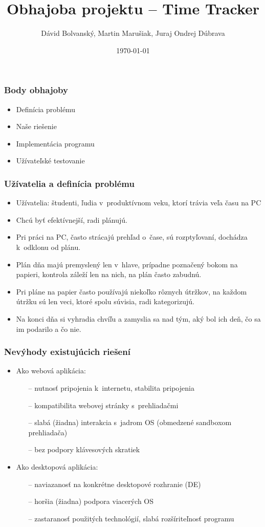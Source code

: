 \documentclass[10pt,xcolor=pdflatex]{beamer}
\title[Time Tracker]{Obhajoba projektu -- Time Tracker}
\author[]{\small Dávid Bolvanský, Martin Marušiak, Juraj Ondrej Dúbrava}
\institute[]{}
\date{\today}
\begin{document}
\frame[plain]{\titlepage}

\begin{frame}
\frametitle{Body obhajoby}
\begin{itemize}
	\item Definícia problému
	\item Naše riešenie
	\item Implementácia programu
	\item Užívateľské testovanie
\end{itemize}
\end{frame}


\begin{frame}
\frametitle{Užívatelia a definícia problému}
\begin{itemize}
	\item Užívatelia: študenti, ľudia v~produktívnom veku, ktorí trávia veľa času na PC
	\item Chcú byť efektívnejší, radi plánujú.
	\item Pri práci na PC, často strácajú prehľad o~čase, sú rozptyľovaní, dochádza k~odklonu od plánu.
	\item Plán dňa majú premyslený len v~hlave, prípadne poznačený bokom na papieri, kontrola záleží len na nich, na plán často zabudnú.
	\item Pri pláne na papier často používajú niekoľko rôznych útržkov, na každom útržku sú len veci, ktoré spolu súvisia, radi kategorizujú.
	\item Na konci dňa si vyhradia chvíľu a zamyslia sa nad tým, aký bol ich deň, čo sa im podarilo a čo nie.
\end{itemize}
\end{frame}

\begin{frame}
	\frametitle{Nevýhody existujúcich riešení}
	\begin{itemize}
		\item Ako webová aplikácia:
			\begin{itemize}
				\item[--] nutnosť pripojenia k~internetu, stabilita pripojenia
				\item[--] kompatibilita webovej stránky s~prehliadačmi
				\item[--] slabá (žiadna) interakcia s~jadrom OS (obmedzené sandboxom prehliadača)
				\item[--] bez podpory klávesových skratiek
			\end{itemize}
		\item Ako desktopová aplikácia:
		\begin{itemize}
			\item[--] naviazanosť na konkrétne desktopové rozhranie (DE)
			\item[--] horšia (žiadna) podpora viacerých OS
			\item[--] zastaranosť použitých technológií, slabá rozšíriteľnosť programu
		\end{itemize}
	\end{itemize}
\end{frame}
\end{document}

